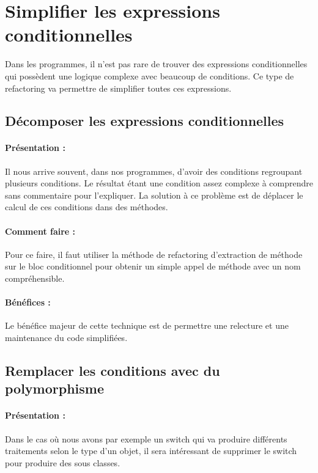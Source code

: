 \documentclass[a4paper,twoside,12pt,openright]{report}
\begin{document}
\newpage
\section{Simplifier les expressions conditionnelles}
Dans les programmes, il n'est pas rare de trouver des expressions conditionnelles qui possèdent une logique complexe avec beaucoup de conditions. Ce type de refactoring va permettre de simplifier toutes ces expressions.\\



\subsection{Décomposer les expressions conditionnelles}
\paragraph{Présentation :}
Il nous arrive souvent, dans nos programmes, d'avoir des conditions regroupant plusieurs conditions. Le résultat étant une condition assez complexe à comprendre sans commentaire pour l'expliquer. La solution à ce problème est de déplacer le calcul de ces conditions dans des méthodes.

\paragraph{Comment faire :}
Pour ce faire, il faut utiliser la méthode de refactoring d'extraction de méthode sur le bloc conditionnel pour obtenir un simple appel de méthode avec un nom compréhensible.

\paragraph{Bénéfices :}
Le bénéfice majeur de cette technique est de permettre une relecture et une maintenance du code simplifiées.\\

\subsection{Remplacer les conditions avec du polymorphisme}
\paragraph{Présentation :}
Dans le cas où nous avons par exemple un switch qui va produire différents traitements selon le type d'un objet, il sera intéressant de supprimer le switch pour produire des sous classes.
\end{document}
